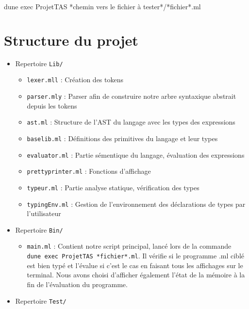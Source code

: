 \documentclass[
  12pt,
]{article}
\newenvironment{Shaded}{}{}
\newcommand{\ExtensionTok}[1]{#1}
\newcommand{\NormalTok}[1]{#1}
\newcommand{\PreprocessorTok}[1]{\textcolor[rgb]{0.74,0.48,0.00}{#1}}
\providecommand{\tightlist}{%
  \setlength{\itemsep}{0pt}\setlength{\parskip}{0pt}}
\begin{document}
\begin{Shaded}
\begin{Highlighting}[]
    \ExtensionTok{dune}\NormalTok{ exec ProjetTAS }\PreprocessorTok{*}\NormalTok{chemin vers le fichier à tester}\PreprocessorTok{*}\NormalTok{/}\PreprocessorTok{*}\NormalTok{fichier}\PreprocessorTok{*}\NormalTok{.ml}
\end{Highlighting}
\end{Shaded}

\newpage

\section{Structure du projet}\label{structure-du-projet}

\begin{itemize}
\tightlist
\item
  Repertoire \texttt{Lib/}

  \begin{itemize}
  \tightlist
  \item
    \texttt{lexer.mll} : Création des tokens
  \item
    \texttt{parser.mly} : Parser afin de construire notre arbre
    syntaxique abstrait depuis les tokens
  \item
    \texttt{ast.ml} : Structure de l'AST du langage avec les types des
    expressions
  \item
    \texttt{baselib.ml} : Définitions des primitives du langage et leur
    types
  \item
    \texttt{evaluator.ml} : Partie sémentique du langage, évaluation des
    expressions
  \item
    \texttt{prettyprinter.ml} : Fonctions d'affichage
  \item
    \texttt{typeur.ml} : Partie analyse statique, vérification des types
  \item
    \texttt{typingEnv.ml} : Gestion de l'environnement des déclarations
    de types par l'utilisateur
  \end{itemize}
\item
  Repertoire \texttt{Bin/}

  \begin{itemize}
  \tightlist
  \item
    \texttt{main.ml} : Contient notre script principal, lancé lors de la
    commande \texttt{dune\ exec\ ProjetTAS\ *fichier*.ml}. Il vérifie si
    le programme .ml ciblé est bien typé et l'évalue si c'est le cas en
    faisant tous les affichages sur le terminal. Nous avons choisi
    d'afficher également l'état de la mémoire à la fin de l'évaluation
    du programme.
  \end{itemize}
\item
  Repertoire \texttt{Test/}


\end{itemize}
\end{document}
